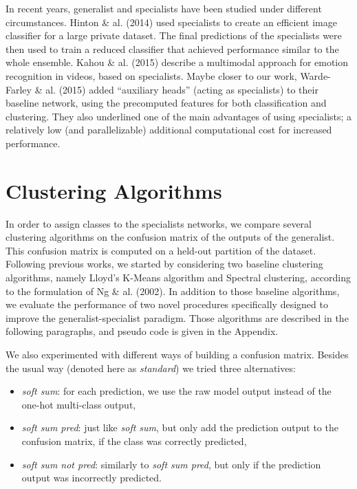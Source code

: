 \documentclass[12pt]{article}
\begin{document}
In recent years, generalist and specialists have been studied under
different circumstances. Hinton \& al. (2014) used specialists to create
an efficient image classifier for a large private dataset. The final
predictions of the specialists were then used to train a reduced
classifier that achieved performance similar to the whole ensemble.
Kahou \& al. (2015) describe a multimodal approach for emotion
recognition in videos, based on specialists. Maybe closer to our work,
Warde-Farley \& al. (2015) added ``auxiliary heads'' (acting as
specialists) to their baseline network, using the precomputed features
for both classification and clustering. They also underlined one of the
main advantages of using specialists; a relatively low (and
parallelizable) additional computational cost for increased performance.

\section{Clustering Algorithms}\label{clustering-algorithms}

In order to assign classes to the specialists networks, we compare
several clustering algorithms on the confusion matrix of the outputs of
the generalist. This confusion matrix is computed on a held-out
partition of the dataset. Following previous works, we started by
considering two baseline clustering algorithms, namely Lloyd's K-Means
algorithm and Spectral clustering, according to the formulation of Ng \&
al. (2002). In addition to those baseline algorithms, we evaluate the
performance of two novel procedures specifically designed to improve the
generalist-specialist paradigm. Those algorithms are described in the
following paragraphs, and pseudo code is given in the Appendix.

We also experimented with different ways of building a confusion matrix.
Besides the usual way (denoted here as \emph{standard}) we tried three
alternatives:

\begin{itemize}
\itemsep1pt\parskip0pt
\item
  \emph{soft sum}: for each prediction, we use the raw model output
  instead of the one-hot multi-class output,
\item
  \emph{soft sum pred}: just like \emph{soft sum}, but only add the
  prediction output to the confusion matrix, if the class was correctly
  predicted,
\item
  \emph{soft sum not pred}: similarly to \emph{soft sum pred}, but only
  if the prediction output was incorrectly predicted.
\end{itemize}
\end{document}

